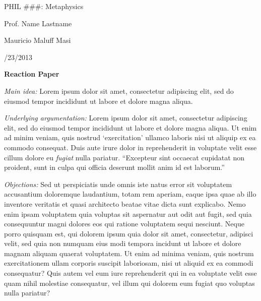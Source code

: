 \documentclass[letter,11pt]{article}
\begin{document}
\begin{spacing}{1}
\noindent PHIL \#\#\#: Metaphysics

\noindent Prof. Name Lastname

\noindent Mauricio Maluff Masi

/23/2013   \\

\end{spacing}

{\centering
\textbf{Reaction Paper}

}

\emph{Main idea:} Lorem ipsum dolor sit amet, consectetur adipiscing elit, sed do eiusmod tempor incididunt ut labore et dolore magna aliqua.

\emph{Underlying argumentation:} Lorem ipsum dolor sit amet, consectetur adipiscing elit, sed do eiusmod tempor incididunt ut labore et dolore magna aliqua. Ut enim ad minim veniam, quis nostrud `exercitation' ullamco laboris nisi ut aliquip ex ea commodo consequat. Duis aute irure dolor in reprehenderit in voluptate velit esse cillum dolore eu \emph{fugiat} nulla pariatur. ``Excepteur sint occaecat cupidatat non proident, sunt in culpa qui officia deserunt mollit anim id est laborum.''


\emph{Objections:} Sed ut perspiciatis unde omnis iste natus error sit voluptatem accusantium doloremque laudantium, totam rem aperiam, eaque ipsa quae ab illo inventore veritatis et quasi architecto beatae vitae dicta sunt explicabo. Nemo enim ipsam voluptatem quia voluptas sit aspernatur aut odit aut fugit, sed quia consequuntur magni dolores eos qui ratione voluptatem sequi nesciunt. Neque porro quisquam est, qui dolorem ipsum quia dolor sit amet, consectetur, adipisci velit, sed quia non numquam eius modi tempora incidunt ut labore et dolore magnam aliquam quaerat voluptatem. Ut enim ad minima veniam, quis nostrum exercitationem ullam corporis suscipit laboriosam, nisi ut aliquid ex ea commodi consequatur? Quis autem vel eum iure reprehenderit qui in ea voluptate velit esse quam nihil molestiae consequatur, vel illum qui dolorem eum fugiat quo voluptas nulla pariatur?
\end{document}
